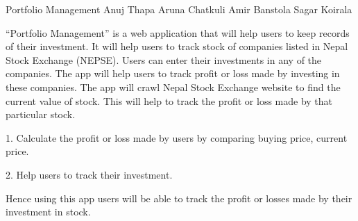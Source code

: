  \begin{conf-abstract}[]
 {Portfolio Management}
 { Anuj Thapa
 	Aruna Chatkuli
 	Amir Banstola
 	Sagar Koirala
 }
{}

“Portfolio Management” is a web application that will help users to keep
records of their investment. It will help users to track stock of companies listed in Nepal Stock Exchange (NEPSE). Users can enter their investments in any of the companies. The app will help users to track profit or loss made by investing in these companies. The app will crawl Nepal Stock Exchange website to find the current value of stock. This will help to track the profit or loss made by that particular stock.

1. Calculate the profit or loss made by users by comparing buying
price, current price.

2. Help users to track their investment.

Hence using this app users will be able to track the profit or losses made by their investment in stock.
\end{conf-abstract}